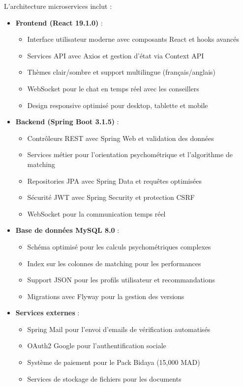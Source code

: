 \documentclass[12pt,a4paper]{report}
\begin{document}
L'architecture microservices inclut :
\begin{itemize}
    \item \textbf{Frontend (React 19.1.0)} : 
    \begin{itemize}
        \item Interface utilisateur moderne avec composants React et hooks avancés
        \item Services API avec Axios et gestion d'état via Context API
        \item Thèmes clair/sombre et support multilingue (français/anglais)
        \item WebSocket pour le chat en temps réel avec les conseillers
        \item Design responsive optimisé pour desktop, tablette et mobile
    \end{itemize}
    
    \item \textbf{Backend (Spring Boot 3.1.5)} :
    \begin{itemize}
        \item Contrôleurs REST avec Spring Web et validation des données
        \item Services métier pour l'orientation psychométrique et l'algorithme de matching
        \item Repositories JPA avec Spring Data et requêtes optimisées
        \item Sécurité JWT avec Spring Security et protection CSRF
        \item WebSocket pour la communication temps réel
    \end{itemize}
    
    \item \textbf{Base de données MySQL 8.0} :
    \begin{itemize}
        \item Schéma optimisé pour les calculs psychométriques complexes
        \item Index sur les colonnes de matching pour les performances
        \item Support JSON pour les profils utilisateur et recommandations
        \item Migrations avec Flyway pour la gestion des versions
    \end{itemize}
    
    \item \textbf{Services externes} :
    \begin{itemize}
        \item Spring Mail pour l'envoi d'emails de vérification automatisés
        \item OAuth2 Google pour l'authentification sociale
        \item Système de paiement pour le Pack Bidaya (15,000 MAD)
        \item Services de stockage de fichiers pour les documents
    \end{itemize}
\end{itemize}
\end{document}

